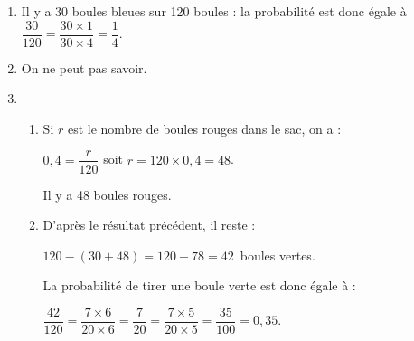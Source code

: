 
\medskip

%
%


\begin{enumerate}
\item %
Il y a 30 boules bleues sur 120 boules : la probabilité est donc égale à  $\dfrac{30}{120} = \dfrac{30 \times 1}{30 \times 4} = \dfrac{1}{4}$.
\item %

On ne peut pas savoir.
\item  %
	\begin{enumerate}
		\item %
Si $r$ est le nombre de boules rouges dans le sac, on a :
		
$0,4 = \dfrac{r}{120}$ soit $r = 120 \times 0,4 = 48$.

Il y a 48 boules rouges.
		\item %
		D'après le résultat précédent, il reste :
		
		$120 - (30 + 48) = 120 - 78 = 42$~boules vertes.
		
		La probabilité de tirer une boule verte est donc égale à  :
		
		$\dfrac{42}{120} = \dfrac{7 \times 6}{20\times 6} = \dfrac{7}{20} = \dfrac{7 \times 5}{20\times 5} = \dfrac{35}{100} = 0,35$.
	\end{enumerate}
\end{enumerate}

\vspace{0,5cm}

